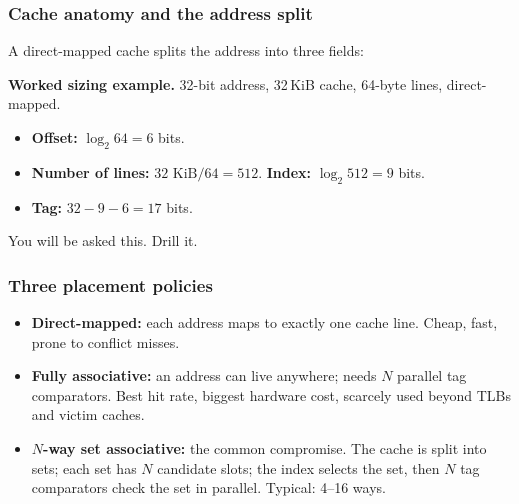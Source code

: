 \documentclass[11pt,a4paper]{article}
\begin{document}
\subsubsection*{Cache anatomy and the address split}

A direct-mapped cache splits the address into three fields:

\begin{center}
\end{center}

\textbf{Worked sizing example.} 32-bit address, 32\,KiB cache, 64-byte lines, direct-mapped.
\begin{itemize}[leftmargin=*,itemsep=1pt]
  \item \textbf{Offset:} $\log_2 64 = 6$ bits.
  \item \textbf{Number of lines:} $32 \text{ KiB} / 64 = 512$. \textbf{Index:} $\log_2 512 = 9$ bits.
  \item \textbf{Tag:} $32 - 9 - 6 = 17$ bits.
\end{itemize}

You will be asked this. Drill it.

\subsubsection*{Three placement policies}

\begin{itemize}[leftmargin=*,itemsep=1pt]
  \item \textbf{Direct-mapped:} each address maps to exactly one cache line. Cheap, fast, prone to conflict misses.
  \item \textbf{Fully associative:} an address can live anywhere; needs $N$ parallel tag comparators. Best hit rate, biggest hardware cost, scarcely used beyond TLBs and victim caches.
  \item \textbf{$N$-way set associative:} the common compromise. The cache is split into sets; each set has $N$ candidate slots; the index selects the set, then $N$ tag comparators check the set in parallel. Typical: 4--16 ways.
\end{itemize}
\end{document}
